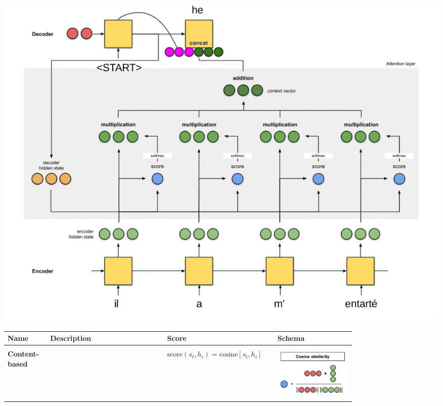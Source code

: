 \documentclass[11pt]{article}
\begin{document}
\begin{center}
	\includegraphics[width=0.6\linewidth]{img/seq2seq_attention2}
\end{center}

\begin{tabularx}{\linewidth}{m{0.1\linewidth} m{0.3\linewidth} m{0.2\linewidth} m{0.2\linewidth}}
	\textbf{Name} & \textbf{Description} & \textbf{Score} & \textbf{Schema}\\
	\hline
	& & & \\[-1em]
	\textbf{Content-based} & \parencite{graves2014neural} & $\text{score}(s_t,h_i) = \text{cosine}\left[s_t,h_i\right] $ & \includegraphics[width=\linewidth]{img/attention_cosine}\\
	& & & \\[-0.5em]

\end{tabularx}
\end{document}
